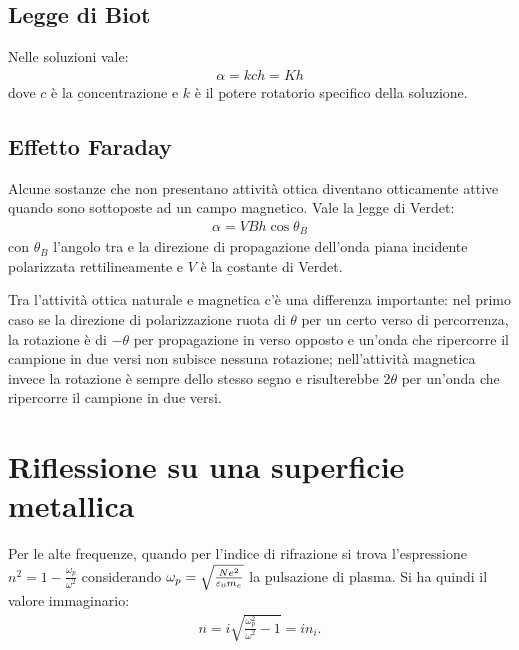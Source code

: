 \subsection{Legge di Biot}
Nelle soluzioni vale:
\begin{equation}\begin{split}
\alpha=kch=Kh
\end{split}\end{equation}
dove $c$ è la \b{concentrazione} e $k$ è il \b{potere rotatorio specifico della soluzione}.

\subsection{Effetto Faraday}
Alcune sostanze che non presentano attività ottica diventano otticamente attive quando sono sottoposte ad un campo magnetico. Vale la \b{legge di Verdet}:
\begin{equation}\begin{split}
\alpha=VBh\cos{\theta_B}
\end{split}\end{equation}
con $\theta_B$ l'angolo tra \dB e la direzione di propagazione dell'onda piana incidente polarizzata rettilineamente e $V$ è la \b{costante di Verdet}.

Tra l'attività ottica naturale e magnetica c'è una differenza importante: nel primo caso se la direzione di polarizzazione ruota di $\theta$ per un certo verso di percorrenza, la rotazione è di $-\theta$ per propagazione in verso opposto e un'onda che ripercorre il campione in due versi non subisce nessuna rotazione; nell'attività magnetica invece la rotazione è sempre dello stesso segno e risulterebbe $2\theta$ per un'onda che ripercorre il campione in due versi.

\section{Riflessione su una superficie metallica}%
Per le alte frequenze, quando per l'indice di rifrazione si trova l'espressione $n^2=1-\frac{\omega_p}{\omega^2}$ considerando $\omega_p=\sqrt{\frac{Ne^2}{\varepsilon_0m_e}}$ la \b{pulsazione di plasma}. Si ha quindi il valore immaginario:
\begin{equation}\begin{split}
n=i\sqrt{\frac{\omega_p^2}{\omega^2}-1}=in_i.
\end{split}\end{equation}


